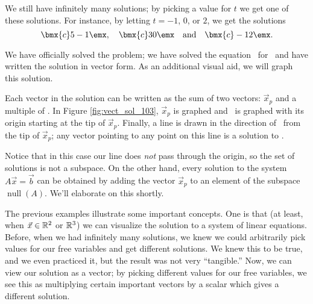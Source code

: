 {We still have infinitely many solutions; by picking a value for $t$ we get one of these solutions. For instance, by letting $t= -1$, $0$, or $2$, we get the solutions 
\[
\bmx{c} 5\\-1\emx, \quad \bmx{c} 3\\0\emx \quad \text{and} \quad \bmx{c} -1\\2\emx.
\]


We have officially solved the problem; we have solved the equation \ttaxb\ for \vx\ and have written the solution in vector form. As an additional visual aid, we will graph this solution. 

Each vector in the solution can be written as the sum of two vectors: $\vec{x}_p$ and a multiple of \vv. In Figure \ref{fig:vect_sol_103}, $\vec{x}_p$ is graphed and \vv\ is graphed with its origin starting at the tip of $\vec{x}_p$. Finally, a line is drawn in the direction of \vv\ from the tip of $\vec{x}_p$; any vector pointing to any point on this line is a solution to \ttaxb.


Notice that in this case our line does \textit{not} pass through the origin, so the set of solutions is not a subspace. On the other hand, every solution to the system $A\vec x = \vec b$ can be obtained by adding the vector $\vec{x}_p$ to an element of the subspace $\operatorname{null}(A)$. We'll elaborate on this shortly.
}

\medskip

The previous examples illustrate some important concepts. One is that (at least, when $\vec x\in \mathbb{R}^2$ or $\mathbb{R}^3$) we can visualize the solution to a system of linear equations. Before, when we had infinitely many solutions, we knew we could arbitrarily pick values for our free variables and get different solutions. We knew this to be true, and we even practiced it, but the result was not very ``tangible.'' Now, we can view our solution as a vector; by picking different values for our free variables, we see this as multiplying certain important vectors by a scalar which gives a different solution.

